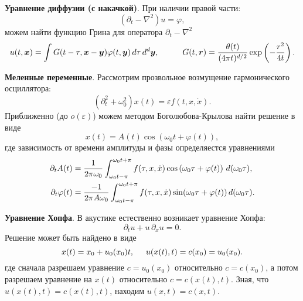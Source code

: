 \textbf{Уравнение диффузии (с накачкой)}.  При наличии правой части:
\begin{equation*}
    (\partial_t - \nabla^2) u = \varphi,
\end{equation*}
можем найти функцию Грина для оператора $\partial_t - \nabla^2$
\begin{equation*}
    u(t, \vc{x}) =  \int G(t-\tau, \vc{x}-\vc{y}) \varphi(t, \vc{y}) \d \tau \d^d \vc{y},
    \hspace{10 mm} 
    G(t, \vc{r}) = \frac{\theta(t)}{(4 \pi t)^{d/2}} \exp\left(- \frac{r^2}{4 t}\right).
\end{equation*}

\textbf{Меленные переменные}. Рассмотрим прозвольное возмущение гармонического осциллятора:
\begin{equation}
    \left(\partial_t^2 + \omega_0^2\right) x(t) = \varepsilon f(t, x, \dot{x}).
    \label{sloweq}
\end{equation}
Приближенно (до $o(\varepsilon)$) можем методом Боголюбова-Крылова найти
решение в виде
\begin{equation}
    x(t) = A(t) \cos(\omega_0 t + \varphi(t)),
    \label{sloweqview}
\end{equation}
где зависимость от времени амплитуды и фазы определяестся уравнениями
\begin{align}
    \partial_t A(t) &= \frac{1}{2\pi \omega_0}\int_{\omega_0 t-\pi}^{\omega_0 t+\pi} f(\tau, x, \dot{x}) \cos\left(\omega_0 \tau + \varphi(t)\right) \, d (\omega_0\tau), 
    \label{slowA}
    \\
    \partial_t \varphi(t) &= \frac{-1}{2 \pi A \omega_0} \int_{\omega_0 t-\pi}^{\omega_0 t + \pi} f(\tau, x, \dot{x}) \sin(\omega_0 \tau + \varphi(t)) \, d (\omega_0 \tau).
    \label{slowphi}
\end{align}



\textbf{Уравнение Хопфа}.  В акустике естественно возникает уравнение Хопфа:
\begin{equation*}
    \partial_t u + u\, \partial_x u = 0.
\end{equation*}
Решение может быть найдено в виде
\begin{equation*}
    x(t) = x_0 + u_0 (x_0) t, \hspace{5 mm} 
    u(x(t), t) = c(x_0) = u_0 (x_0).
\end{equation*}
где сначала разрешаем уравнение $c = u_0 (x_0)$ относительно $c = c(x_0)$, а потом разрешаем уравнение на $x(t)$ относительно $c = c(x(t), t)$. 
Зная, что $u(x(t), t) = c(x(t), t)$, находим $u(x, t) = c(x, t)$. 


